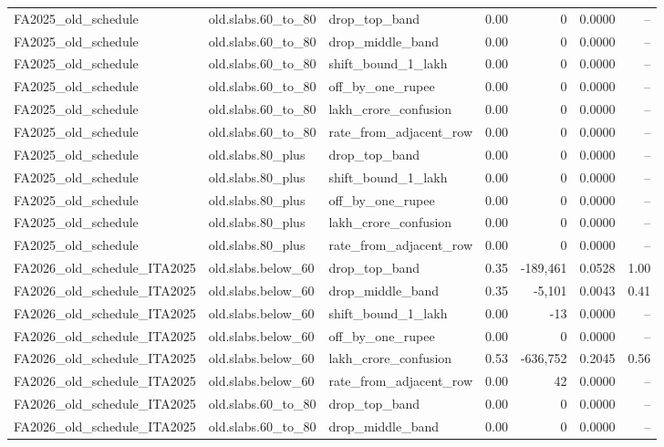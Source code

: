 \begin{table}[t]
\begin{tabular}{lllrrrr}
FA2025\_old\_schedule & old.slabs.60\_to\_80 & drop\_top\_band & 0.00 & 0 & 0.0000 & -- \\
FA2025\_old\_schedule & old.slabs.60\_to\_80 & drop\_middle\_band & 0.00 & 0 & 0.0000 & -- \\
FA2025\_old\_schedule & old.slabs.60\_to\_80 & shift\_bound\_1\_lakh & 0.00 & 0 & 0.0000 & -- \\
FA2025\_old\_schedule & old.slabs.60\_to\_80 & off\_by\_one\_rupee & 0.00 & 0 & 0.0000 & -- \\
FA2025\_old\_schedule & old.slabs.60\_to\_80 & lakh\_crore\_confusion & 0.00 & 0 & 0.0000 & -- \\
FA2025\_old\_schedule & old.slabs.60\_to\_80 & rate\_from\_adjacent\_row & 0.00 & 0 & 0.0000 & -- \\
FA2025\_old\_schedule & old.slabs.80\_plus & drop\_top\_band & 0.00 & 0 & 0.0000 & -- \\
FA2025\_old\_schedule & old.slabs.80\_plus & shift\_bound\_1\_lakh & 0.00 & 0 & 0.0000 & -- \\
FA2025\_old\_schedule & old.slabs.80\_plus & off\_by\_one\_rupee & 0.00 & 0 & 0.0000 & -- \\
FA2025\_old\_schedule & old.slabs.80\_plus & lakh\_crore\_confusion & 0.00 & 0 & 0.0000 & -- \\
FA2025\_old\_schedule & old.slabs.80\_plus & rate\_from\_adjacent\_row & 0.00 & 0 & 0.0000 & -- \\
FA2026\_old\_schedule\_ITA2025 & old.slabs.below\_60 & drop\_top\_band & 0.35 & -189,461 & 0.0528 & 1.00 \\
FA2026\_old\_schedule\_ITA2025 & old.slabs.below\_60 & drop\_middle\_band & 0.35 & -5,101 & 0.0043 & 0.41 \\
FA2026\_old\_schedule\_ITA2025 & old.slabs.below\_60 & shift\_bound\_1\_lakh & 0.00 & -13 & 0.0000 & -- \\
FA2026\_old\_schedule\_ITA2025 & old.slabs.below\_60 & off\_by\_one\_rupee & 0.00 & 0 & 0.0000 & -- \\
FA2026\_old\_schedule\_ITA2025 & old.slabs.below\_60 & lakh\_crore\_confusion & 0.53 & -636,752 & 0.2045 & 0.56 \\
FA2026\_old\_schedule\_ITA2025 & old.slabs.below\_60 & rate\_from\_adjacent\_row & 0.00 & 42 & 0.0000 & -- \\
FA2026\_old\_schedule\_ITA2025 & old.slabs.60\_to\_80 & drop\_top\_band & 0.00 & 0 & 0.0000 & -- \\
FA2026\_old\_schedule\_ITA2025 & old.slabs.60\_to\_80 & drop\_middle\_band & 0.00 & 0 & 0.0000 & -- \\

\end{tabular}
\end{table}
